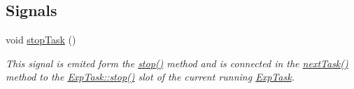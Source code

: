 \subsection*{Signals}
\begin{DoxyCompactItemize}
\item 
\hypertarget{class_exp_task_list_a445b0e774f24ebcd351ef5121d7f9487}{}void \hyperlink{class_exp_task_list_a445b0e774f24ebcd351ef5121d7f9487}{stop\+Task} ()\label{class_exp_task_list_a445b0e774f24ebcd351ef5121d7f9487}

\begin{DoxyCompactList}\small\item\em This signal is emited form the \hyperlink{class_exp_task_list_ae3542825c792c23c1f2a54b9d63074d1}{stop()} method and is connected in the \hyperlink{class_exp_task_list_a2aa559b46e0fa585386fdf209ab2f366}{next\+Task()} method to the \hyperlink{class_exp_task_a22f581786f11fa3c7dc52ff90c6b7043}{Exp\+Task\+::stop()} slot of the current running \hyperlink{class_exp_task}{Exp\+Task}. \end{DoxyCompactList}\end{DoxyCompactItemize}
